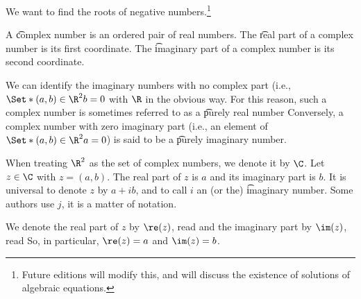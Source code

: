 

We want to find the roots of negative numbers.\footnote{Future editions will modify this, and will discuss the existence of solutions of algebraic equations.}


A \t{complex number} is an ordered pair of real numbers.
The \t{real part} of a complex number is its first coordinate.
The \t{imaginary part} of a complex number is its second coordinate.

We can identify the imaginary numbers with no complex part (i.e., $\Set*{(a, b) \in \R^2}{b = 0}$ with $\R$ in the obvious way.
For this reason, such a complex number is sometimes referred to as a \t{purely real number}
Conversely, a complex number with zero imaginary part (i.e., an element of $\Set*{(a, b) \in \R^2}{a = 0}$) is said to be a \t{purely imaginary number}.


When treating $\R^2$ as the set of complex numbers, we denote it by $\C$.
Let $z \in \C$ with $z = (a, b)$.
The real part of $z$ is $a$ and its imaginary part is $b$.
It is universal to denote $z$ by $a + ib$, and to call $i$ an (or the) \t{imaginary number}.
Some authors use $j$, it is a matter of notation.

We denote the real part of $z$ by $\re(z)$, read  and the imaginary part by $\im(z)$, read 
So, in particular,  $\re(z) = a$ and $\im(z) = b$.

\blankpage
